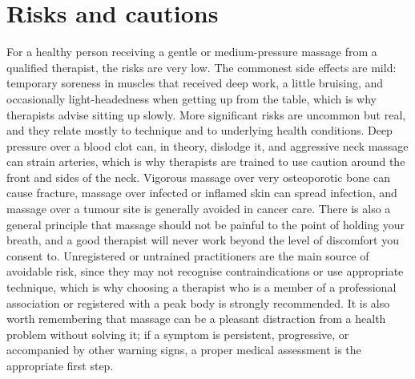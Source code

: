 \section*{Risks and cautions}
For a healthy person receiving a gentle or medium-pressure massage from a qualified therapist, the risks are very low. The commonest side effects are mild: temporary soreness in muscles that received deep work, a little bruising, and occasionally light-headedness when getting up from the table, which is why therapists advise sitting up slowly. More significant risks are uncommon but real, and they relate mostly to technique and to underlying health conditions. Deep pressure over a blood clot can, in theory, dislodge it, and aggressive neck massage can strain arteries, which is why therapists are trained to use caution around the front and sides of the neck. Vigorous massage over very osteoporotic bone can cause fracture, massage over infected or inflamed skin can spread infection, and massage over a tumour site is generally avoided in cancer care. There is also a general principle that massage should not be painful to the point of holding your breath, and a good therapist will never work beyond the level of discomfort you consent to. Unregistered or untrained practitioners are the main source of avoidable risk, since they may not recognise contraindications or use appropriate technique, which is why choosing a therapist who is a member of a professional association or registered with a peak body is strongly recommended. It is also worth remembering that massage can be a pleasant distraction from a health problem without solving it; if a symptom is persistent, progressive, or accompanied by other warning signs, a proper medical assessment is the appropriate first step.

